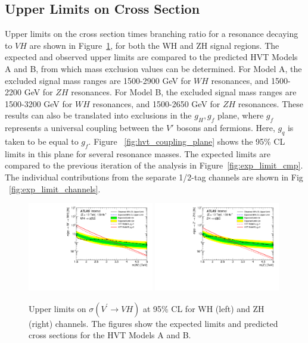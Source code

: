 \subsection{Upper Limits on Cross Section}
Upper limits on the cross section times branching ratio for a resonance decaying to $VH$ are shown in Figure~\ref{fig:exp_limits_atlas}, for both the WH and ZH signal regions.
The expected and observed upper limits are compared to the predicted HVT Models A and B, from which mass exclusion values can be determined.
For Model A, the excluded signal mass ranges are 1500-2900 GeV for $WH$ resonances, and 1500-2200 GeV for $ZH$ resonances.
For Model B, the excluded signal mass ranges are 1500-3200 GeV for $WH$ resonances, and 1500-2650 GeV for $ZH$ resonances.
These results can also be translated into exclusions in the {$g_H,g_f$} plane, where $g_f$ represents a universal coupling between the $V'$ bosons and fermions.
Here, $g_q$ is taken to be equal to $g_f$. Figure ~\ref{fig:hvt_coupling_plane} shows the 95\% CL limits in this plane for several resonance masses.
The expected limits are compared to the previous iteration of the analysis in Figure~\ref{fig:exp_limit_cmp}.
The individual contributions from the separate 1/2-tag channels are shown in Fig ~\ref{fig:exp_limit_channels}.

\begin{figure}[htbp!]
    \begin{center}
        \includegraphics[width=0.49\textwidth]{VHqqbbLimitATLAS_WH.pdf}
        \includegraphics[width=0.49\textwidth]{VHqqbbLimitATLAS_ZH.pdf}
    \end{center}
    \caption{Upper limits on $\sigma(V^\prime \rightarrow VH)$ at 95\% CL for WH (left) and ZH (right) channels.
        The figures show the expected limits and predicted cross sections for the HVT Models A and B.
    }
    \label{fig:exp_limits_atlas}
\end{figure}

